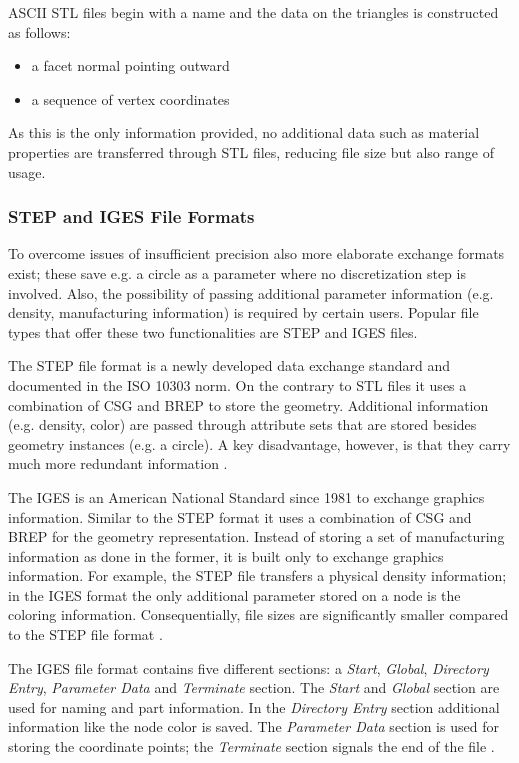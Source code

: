 ASCII \ac{STL} files begin with a name and the data on the triangles is constructed as follows: 
\begin{itemize}
\item a facet normal pointing outward
\item a sequence of vertex coordinates
\end{itemize}
As this is the only information provided, no additional data such as material properties are transferred through \ac{STL} files, reducing file size but also range of usage.
\subsubsection{\acs{STEP} and \acs{IGES} File Formats}
To overcome issues of insufficient precision also more elaborate exchange formats exist; these save e.g. a circle as a parameter where no discretization step is involved. Also, the possibility of passing additional parameter information (e.g. density, manufacturing information) is required by certain users. Popular file types that offer these two functionalities are \acf{STEP} and \acf{IGES} files. 

The \ac{STEP} file format is a newly developed data exchange standard and documented in the ISO 10303 norm. On the contrary to \ac{STL} files it uses a combination of \ac{CSG} and \ac{BREP} to store the geometry. Additional information (e.g. density, color) are passed through attribute sets that are stored besides geometry instances (e.g. a circle). A key disadvantage, however, is that they carry much more redundant information \cite{STL}.


The \acl{IGES} is an American National Standard since 1981 to exchange graphics information. Similar to the \ac{STEP} format it uses a combination of \ac{CSG} and \ac{BREP} for the geometry representation. Instead of storing a set of manufacturing information as done in the former, it is built only to exchange graphics information. For example, the \ac{STEP} file transfers a physical density information; in the \ac{IGES} format the only additional parameter stored on a node is the coloring information. Consequentially, file sizes are significantly smaller compared to the \ac{STEP} file format \cite{STL}.

The \ac{IGES} file format contains five different sections: a \emph{Start}, \emph{Global}, \emph{Directory Entry}, \emph{Parameter Data} and \emph{Terminate} section. The \emph{Start} and \emph{Global} section are used for naming and part information. In the \emph{Directory Entry} section additional information like the node color is saved. The \emph{Parameter Data} section is used for storing the coordinate points; the \emph{Terminate} section signals the end of the file \cite{sarcarCAD}.
